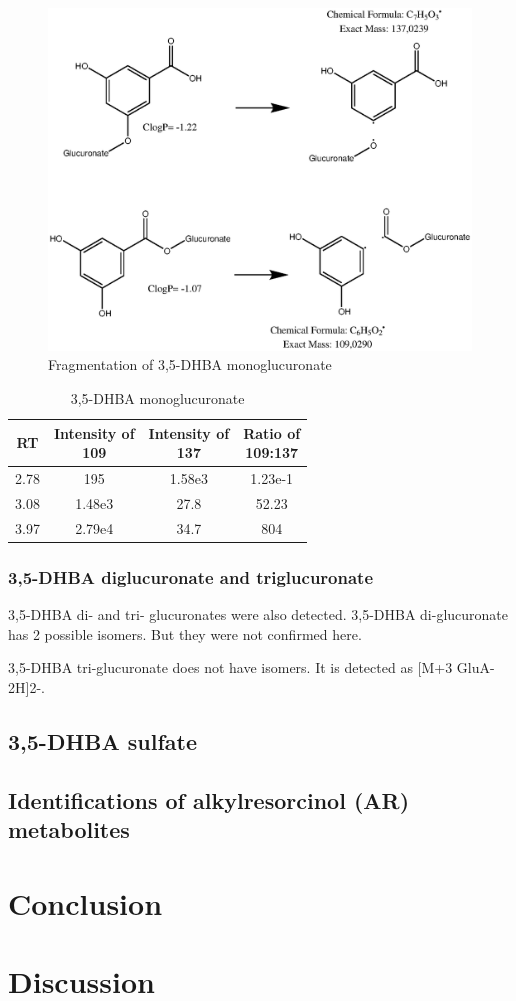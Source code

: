 \begin{figure}[h!]
	\centering
	\includegraphics[width=1\linewidth]{picture/3,5-DHBA-glca-mono}
	\caption{Fragmentation of 3,5-DHBA monoglucuronate}
	\label{fig:35-dhba-glca-mono}
\end{figure}

\begin{table}[h!]
	\centering
\begin{tabular}{|c|c|c|c|}
	\hline 
	RT & \makecell{Intensity of\\ 109} & \makecell{Intensity of\\ 137} & \makecell{Ratio of \\109:137} \\ 
	\hline 
	2.78 & 195 & 1.58e3 & 1.23e-1 \\ 
	\hline 
	3.08 & 1.48e3 & 27.8 & 52.23 \\ 
	\hline 
	3.97 & 2.79e4 & 34.7 & 804 \\ 
	\hline 
\end{tabular} 
\caption{3,5-DHBA monoglucuronate}
\label{tab:35-dhba-monoglucuronate}
\end{table}

\subsubsection{3,5-DHBA diglucuronate and triglucuronate}
3,5-DHBA di- and tri- glucuronates were also detected.
3,5-DHBA di-glucuronate has 2 possible isomers. But they were not confirmed here.

3,5-DHBA tri-glucuronate does not have isomers. It is detected as [M+3 GluA-2H]2-.

\subsection{3,5-DHBA sulfate}

\subsection{Identifications of alkylresorcinol (AR) metabolites}

\section{Conclusion}


\section{Discussion}